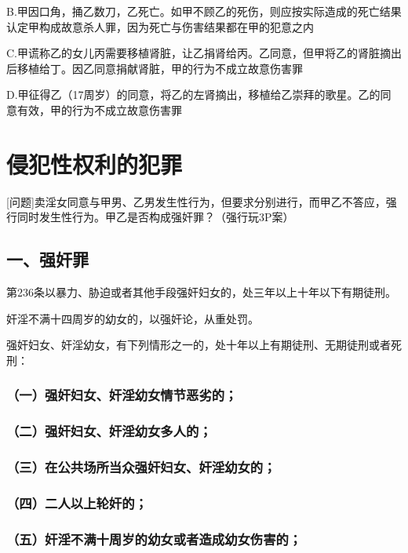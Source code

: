 B.甲因口角，捅乙数刀，乙死亡。如甲不顾乙的死伤，则应按实际造成的死亡结果认定甲构成故意杀人罪，因为死亡与伤害结果都在甲的犯意之内

C.甲谎称乙的女儿丙需要移植肾脏，让乙捐肾给丙。乙同意，但甲将乙的肾脏摘出后移植给丁。因乙同意捐献肾脏，甲的行为不成立故意伤害罪

D.甲征得乙（17周岁）的同意，将乙的左肾摘出，移植给乙崇拜的歌星。乙的同意有效，甲的行为不成立故意伤害罪

\section{侵犯性权利的犯罪}

[问题]卖淫女同意与甲男、乙男发生性行为，但要求分别进行，而甲乙不答应，强行同时发生性行为。甲乙是否构成强奸罪？（强行玩3P案）

\subsection*{一、强奸罪}

第236条以暴力、胁迫或者其他手段强奸妇女的，处三年以上十年以下有期徒刑。

奸淫不满十四周岁的幼女的，以强奸论，从重处罚。

强奸妇女、奸淫幼女，有下列情形之一的，处十年以上有期徒刑、无期徒刑或者死刑：

\subsubsection*{（一）强奸妇女、奸淫幼女情节恶劣的；}

\subsubsection*{（二）强奸妇女、奸淫幼女多人的；}

\subsubsection*{（三）在公共场所当众强奸妇女、奸淫幼女的；}

\subsubsection*{（四）二人以上轮奸的；}

\subsubsection*{（五）奸淫不满十周岁的幼女或者造成幼女伤害的；}

